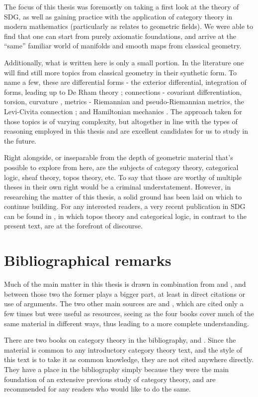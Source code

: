The focus of this thesis was foremostly on taking a first look at the theory of SDG, as well as gaining practice with the application of category theory in modern mathematics (particularly as relates to geometric fields). We were able to find that one can start from purely axiomatic foundations, and arrive at the ``same'' familiar world of manifolds and smooth maps from classical geometry.

Additionally, what is written here is only a small portion. In the literature one will find still more topics from classical geometry in their synthetic form. To name a few, these are differential forms - the exterior differential, integration of forms, leading up to De Rham theory \cite{lav96}; connections - covariant differentiation, torsion, curvature \cite{lav96}, metrics - Riemannian and pseudo-Riemannian metrics, the Levi-Civita connection \cite{kock10}; and Hamiltonian mechanics \cite{lav96, nish96}. The approach taken for those topics is of varying complexity, but altogether in line with the types of reasoning employed in this thesis and are excellent candidates for us to study in the future.

Right alongside, or inseparable from the depth of geometric material that's possible to explore from here, are the subjects of category theory, categorical logic, sheaf theory, topos theory, etc. To say that those are worthy of multiple theses in their own right would be a criminal understatement. However, in researching the matter of this thesis, a solid ground has been laid on which to continue building. For any interested readers, a very recent publication in SDG can be found in \cite{bun17}, in which topos theory and categorical logic, in contrast to the present text, are at the forefront of discourse.

\section{Bibliographical remarks}

Much of the main matter in this thesis is drawn in combination from \cite{kock06} and \cite{lav96}, and between those two the former plays a bigger part, at least in direct citations or use of arguments. The two other main sources are \cite{bun17} and \cite{kock10}, which are cited only a few times but were useful as resources, seeing as the four books cover much of the same material in different ways, thus leading to a more complete understanding.

There are two books on category theory in the bibliography, \cite{lei16} and \cite{sml71}. Since the material is common to any introductory category theory text, and the style of this text is to take it as common knowledge, they are not cited anywhere directly. They have a place in the bibliography simply because they were the main foundation of an extensive previous study of category theory, and are recommended for any readers who would like to do the same.


